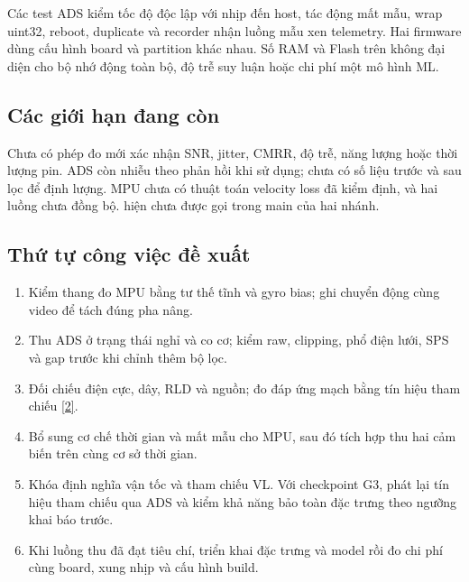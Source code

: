 \documentclass[12pt,letterpaper]{article}
\begin{document}
Các test ADS kiểm tốc độ độc lập với nhịp đến host, tác động mất mẫu, wrap uint32, reboot, duplicate và recorder nhận luồng mẫu xen telemetry. Hai firmware dùng cấu hình board và partition khác nhau. Số RAM và Flash trên không đại diện cho bộ nhớ động toàn bộ, độ trễ suy luận hoặc chi phí một mô hình ML.


\subsection*{Các giới hạn đang còn}

Chưa có phép đo mới xác nhận SNR, jitter, CMRR, độ trễ, năng lượng hoặc thời lượng pin. ADS còn nhiễu theo phản hồi khi sử dụng; chưa có số liệu trước và sau lọc để định lượng. MPU chưa có thuật toán velocity loss đã kiểm định, và hai luồng chưa đồng bộ.  hiện chưa được gọi trong main của hai nhánh.


\subsection*{Thứ tự công việc đề xuất}

\begin{enumerate}

\item Kiểm thang đo MPU bằng tư thế tĩnh và gyro bias; ghi chuyển động cùng video để tách đúng pha nâng.

\item Thu ADS ở trạng thái nghỉ và co cơ; kiểm raw, clipping, phổ điện lưới, SPS và gap trước khi chỉnh thêm bộ lọc.

\item Đối chiếu điện cực, dây, RLD và nguồn; đo đáp ứng mạch bằng tín hiệu tham chiếu \hyperlink{ref2}{[2]}.

\item Bổ sung cơ chế thời gian và mất mẫu cho MPU, sau đó tích hợp thu hai cảm biến trên cùng cơ sở thời gian.

\item Khóa định nghĩa vận tốc và tham chiếu VL. Với checkpoint G3, phát lại tín hiệu tham chiếu qua ADS và kiểm khả năng bảo toàn đặc trưng theo ngưỡng khai báo trước.

\item Khi luồng thu đã đạt tiêu chí, triển khai đặc trưng và model rồi đo chi phí cùng board, xung nhịp và cấu hình build.

\end{enumerate}
\end{document}
